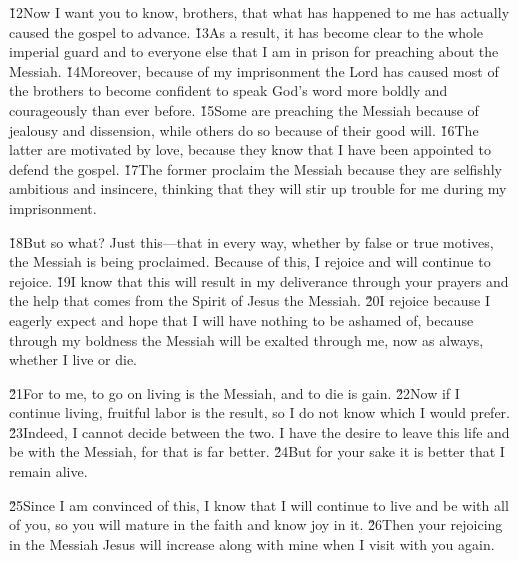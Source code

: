 \v{12}Now I want you to know, brothers, that what has happened to me has actually caused the gospel to advance. \v{13}As a result, it has become clear to the whole imperial guard and to everyone else that I am in prison for preaching about the Messiah. \v{14}Moreover, because of my imprisonment the Lord has caused most of the brothers to become confident to speak God's word more boldly and courageously than ever before. \v{15}Some are preaching the Messiah because of jealousy and dissension, while others do so because of their good will. \v{16}The latter are motivated by love, because they know that I have been appointed to defend the gospel. \v{17}The former proclaim the Messiah because they are selfishly ambitious and insincere, thinking that they will stir up trouble for me during my imprisonment.

\v{18}But so what? Just this---that in every way, whether by false or true motives, the Messiah is being proclaimed. Because of this, I rejoice and will continue to rejoice. \v{19}I know that this will result in my deliverance through your prayers and the help that comes from the Spirit of Jesus the Messiah. \v{20}I rejoice because I eagerly expect and hope that I will have nothing to be ashamed of, because through my boldness the Messiah will be exalted through me, now as always, whether I live or die.

\v{21}For to me, to go on living is the Messiah, and to die is gain. \v{22}Now if I continue living, fruitful labor is the result, so I do not know which I would prefer. \v{23}Indeed, I cannot decide between the two. I have the desire to leave this life and be with the Messiah, for that is far better. \v{24}But for your sake it is better that I remain alive.

\v{25}Since I am convinced of this, I know that I will continue to live and be with all of you, so you will mature in the faith and know joy in it. \v{26}Then your rejoicing in the Messiah Jesus will increase along with mine when I visit with you again.

